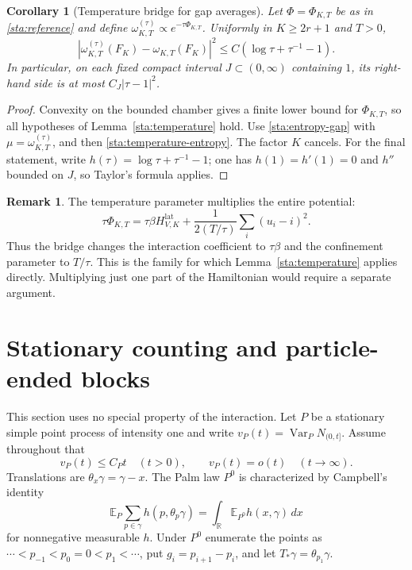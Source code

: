 \documentclass[11pt,reqno]{amsart}
\numberwithin{equation}{section}
\newtheorem{corollary}[theorem]{Corollary}
\theoremstyle{definition}
\newtheorem{remark}[theorem]{Remark}
\newcommand{\R}{\mathbb R}
\newcommand{\E}{\mathbb E}
\newcommand{\1}{\mathbf 1}
\newcommand{\dd}{\,d}
\begin{document}
\begin{corollary}[Temperature bridge for gap averages]
\label{sta:temperature-gap}
Let $\Phi=\Phi_{K,T}$ be as in \eqref{sta:reference} and define
$\omega_{K,T}^{(\tau)}\propto e^{-\tau\Phi_{K,T}}$.
Uniformly in $K\ge2r+1$ and $T>0$,
\begin{equation}\label{sta:temperature-observable}
|\omega_{K,T}^{(\tau)}(F_K)-\omega_{K,T}(F_K)|^2
\le C(\log\tau+\tau^{-1}-1).
\end{equation}
In particular, on each fixed compact interval
$J\subset(0,\infty)$ containing $1$, its right-hand side is at most
$C_J|\tau-1|^2$.
\end{corollary}

\begin{proof}
Convexity on the bounded chamber gives a finite lower bound for
$\Phi_{K,T}$, so all hypotheses of Lemma~\ref{sta:temperature} hold.
Use \eqref{sta:entropy-gap} with
$\mu=\omega_{K,T}^{(\tau)}$, and then
\eqref{sta:temperature-entropy}. The factor $K$ cancels. For the final
statement, write $h(\tau)=\log\tau+\tau^{-1}-1$; one has
$h(1)=h'(1)=0$ and $h''$ bounded on $J$, so Taylor's formula applies.
\end{proof}

\begin{remark}\label{sta:whole-potential}
The temperature parameter multiplies the entire potential:
\[
\tau\Phi_{K,T}
=\tau\beta H^{\mathrm{lat}}_{V,K}
  +\frac{1}{2(T/\tau)}\sum_i(u_i-i)^2.
\]
Thus the bridge changes the interaction coefficient to $\tau\beta$
and the confinement parameter to $T/\tau$. This is the family for which
Lemma~\ref{sta:temperature} applies directly. Multiplying just one
part of the Hamiltonian would require a separate argument.
\end{remark}


\section{Stationary counting and particle-ended blocks}
\label{pre:section}\label{sec:prelim}

This section uses no special property of the interaction. Let $P$ be a
stationary simple point process of intensity one and write
$v_P(t)=\operatorname{Var}_P N_{(0,t]}$. Assume throughout that
\begin{equation}\label{pre:variance}
v_P(t)\le C_Pt\quad(t>0),\qquad v_P(t)=o(t)\quad(t\to\infty).
\end{equation}
Translations are $\theta_x\gamma=\gamma-x$. The Palm law $P^0$ is
characterized by Campbell's identity
\begin{equation}\label{pre:campbell}
\E_P\sum_{p\in\gamma} h(p,\theta_p\gamma)
=\int_{\R}\E_{P^0}h(x,\gamma)\dd x
\end{equation}
for nonnegative measurable $h$. Under $P^0$ enumerate the points as
$\cdots<p_{-1}<p_0=0<p_1<\cdots$, put $g_i=p_{i+1}-p_i$, and let
$T_*\gamma=\theta_{p_1}\gamma$.
\end{document}
